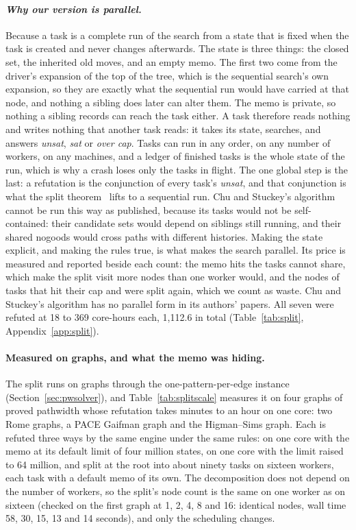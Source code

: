 \paragraph{\textbf{\emph{Why our version is parallel.}}} Because a task is a complete run of
the search from a state that is fixed when the task is created and never
changes afterwards. The state is three things: the closed set, the inherited
old moves, and an empty memo. The first two come from the driver's expansion
of the top of the tree, which is the sequential search's own expansion, so
they are exactly what the sequential run would have carried at that node, and
nothing a sibling does later can alter them. The memo is private, so nothing
a sibling records can reach the task either. A task therefore reads nothing
and writes nothing that another task reads: it takes its state, searches,
and answers \emph{unsat}, \emph{sat} or \emph{over cap}. Tasks can run in any
order, on any number of workers, on any machines, and a ledger of finished
tasks is the whole state of the run, which is why a crash loses only the tasks
in flight. The one global step is the last: a refutation is the conjunction of
every task's \emph{unsat}, and that conjunction is what the split theorem~
lifts to a sequential run. Chu and Stuckey's algorithm cannot be run this way as
published, because its tasks would not be self-contained: their candidate sets
would depend on siblings still running, and their shared nogoods would cross
paths with different histories. Making the state explicit, and making the
rules true, is what makes the search parallel. Its price is measured and
reported beside each count: the memo hits the tasks cannot share, which make
the split visit more nodes than one worker would, and the nodes of tasks
that hit their cap and were split again, which we count as waste. Chu and Stuckey's
algorithm has no parallel form in its authors' papers. All seven were refuted at 18 to 369
core-hours each, 1,112.6 in total (Table~\ref{tab:split},
Appendix~\ref{app:split}).

\paragraph{Measured on graphs, and what the memo was hiding.} The split runs
on graphs through the one-pattern-per-edge instance (Section~\ref{sec:pwsolver}),
and Table~\ref{tab:splitscale} measures it on four graphs of proved pathwidth
whose refutation takes minutes to an hour on one core: two Rome graphs, a PACE
Gaifman graph and the Higman--Sims graph. Each is refuted three ways by the same
engine under the same rules: on one core with the memo at its default limit of
four million states, on one core with the limit raised to 64 million, and split
at the root into about ninety tasks on sixteen workers, each task with a default
memo of its own. The decomposition does not depend on the number of workers, so
the split's node count is the same on one worker as on sixteen (checked on the
first graph at 1, 2, 4, 8 and 16: identical nodes, wall time 58, 30, 15, 13 and
14 seconds), and only the scheduling changes.

